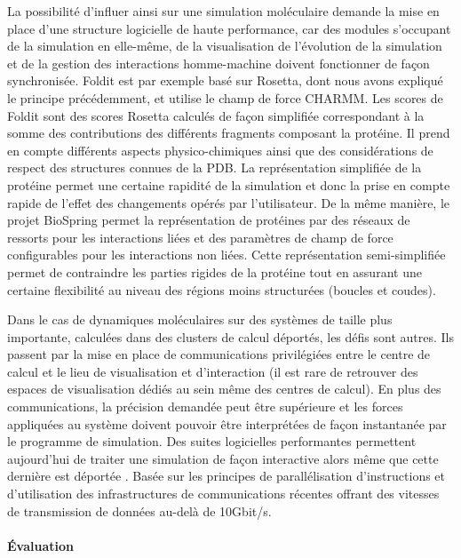 La possibilité d'influer ainsi sur une simulation moléculaire demande la mise en place d'une structure logicielle de haute performance, car des modules s'occupant de la simulation en elle-même, de la visualisation de l'évolution de la simulation et de la gestion des interactions homme-machine doivent fonctionner de façon synchronisée. Foldit est par exemple basé sur Rosetta, dont nous avons expliqué le principe précédemment, et utilise le champ de force CHARMM. Les scores de Foldit sont des scores Rosetta calculés de façon simplifiée correspondant à la somme des contributions des différents fragments composant la protéine. Il prend en compte différents aspects physico-chimiques ainsi que des considérations de respect des structures connues de la PDB.
La représentation simplifiée de la protéine permet une certaine rapidité de la simulation et donc la prise en compte rapide de l'effet des changements opérés par l'utilisateur. De la même manière, le projet BioSpring permet la représentation de protéines par des réseaux de ressorts pour les interactions liées et des paramètres de champ de force configurables pour les interactions non liées. Cette représentation semi-simplifiée permet de contraindre les parties rigides de la protéine tout en assurant une certaine flexibilité au niveau des régions moins structurées (boucles et coudes).

Dans le cas de dynamiques moléculaires sur des systèmes de taille plus importante, calculées dans des clusters de calcul déportés, les défis sont autres. Ils passent par la mise en place de communications privilégiées entre le centre de calcul et le lieu de visualisation et d'interaction (il est rare de retrouver des espaces de visualisation dédiés au sein même des centres de calcul). En plus des communications, la précision demandée peut être supérieure et les forces appliquées au système doivent pouvoir être interprétées de façon instantanée par le programme de simulation. Des suites logicielles performantes permettent aujourd'hui de traiter une simulation de façon interactive alors même que cette dernière est déportée \cite{dreher2014exaviz}. Basée sur les principes de parallélisation d'instructions et d'utilisation des infrastructures de communications récentes offrant des vitesses de transmission de données au-delà de 10Gbit/s.

\paragraph{Évaluation} \label{simu_eval}


